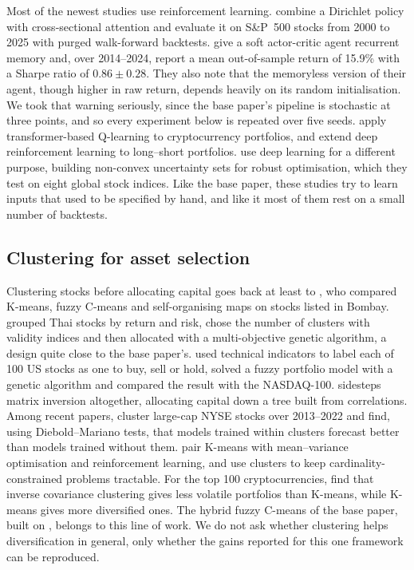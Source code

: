 Most of the newest studies use reinforcement learning. \citet{xue2026} combine a Dirichlet policy with cross-sectional attention and evaluate it on S\&P~500 stocks from 2000 to 2025 with purged walk-forward backtests. \citet{pavithra2026} give a soft actor-critic agent recurrent memory and, over 2014--2024, report a mean out-of-sample return of 15.9\% with a Sharpe ratio of $0.86\pm0.28$. They also note that the memoryless version of their agent, though higher in raw return, depends heavily on its random initialisation. We took that warning seriously, since the base paper's pipeline is stochastic at three points, and so every experiment below is repeated over five seeds. \citet{zepeda2026} apply transformer-based Q-learning to cryptocurrency portfolios, and \citet{huang2026} extend deep reinforcement learning to long--short portfolios. \citet{garg2026} use deep learning for a different purpose, building non-convex uncertainty sets for robust optimisation, which they test on eight global stock indices. Like the base paper, these studies try to learn inputs that used to be specified by hand, and like it most of them rest on a small number of backtests.

\subsection{Clustering for asset selection}

Clustering stocks before allocating capital goes back at least to \citet{nanda2010}, who compared K-means, fuzzy C-means and self-organising maps on stocks listed in Bombay. \citet{long2014} grouped Thai stocks by return and risk, chose the number of clusters with validity indices and then allocated with a multi-objective genetic algorithm, a design quite close to the base paper's. \citet{khan2022} used technical indicators to label each of 100 US stocks as one to buy, sell or hold, solved a fuzzy portfolio model with a genetic algorithm and compared the result with the NASDAQ-100. \citet{lopezdeprado2016} sidesteps matrix inversion altogether, allocating capital down a tree built from correlations. Among recent papers, \citet{ashrafzadeh2025} cluster large-cap NYSE stocks over 2013--2022 and find, using Diebold--Mariano tests, that models trained within clusters forecast better than models trained without them. \citet{zouaghia2025} pair K-means with mean--variance optimisation and reinforcement learning, and \citet{ebrahimi2026} use clusters to keep cardinality-constrained problems tractable. For the top 100 cryptocurrencies, \citet{dastkhan2026crypto} find that inverse covariance clustering gives less volatile portfolios than K-means, while K-means gives more diversified ones. The hybrid fuzzy C-means of the base paper, built on \citet{bezdek1984}, belongs to this line of work. We do not ask whether clustering helps diversification in general, only whether the gains reported for this one framework can be reproduced.

